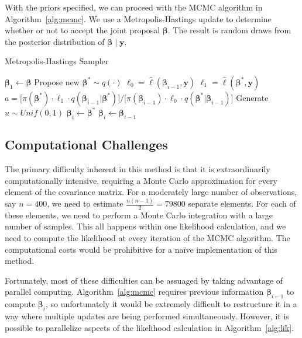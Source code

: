 \documentclass[12pt]{article}
\begin{document}
With the priors specified, we can proceed with the MCMC algorithm in Algorithm~\ref{alg:mcmc}. We use a Metropolis-Hastings update to determine whether or not to accept the joint proposal $\bm{\beta}$. The result is random draws from the posterior distribution of $\bm{\beta} \;|\; \bm{y}$.

\begin{algorithm}[!htb]
  \caption{\small Metropolis-Hastings Sampler} \label{alg:mcmc}
  \begin{algorithmic}[1]
    \State $\bm{\beta}_1 \gets \bm{\beta}$
    \State Propose new $\bm{\beta}^* \sim q(\cdot)$
    \State $\ell_0 = \hat{\ell}(\bm{\beta}_{i-1}, \bm{y})$
    \State $\ell_1 = \hat{\ell}(\bm{\beta}^*, \bm{y})$
    \State $a = \Big[\pi(\bm{\beta}^*) \cdot \ell_1 \cdot q(\bm{\beta}_{i-1}|\bm{\beta}^*)\Big]/\Big[\pi(\bm{\beta}_{i-1}) \cdot \ell_0 \cdot q(\bm{\beta}^*|\bm{\beta}_{i-1})\Big]$
    \State Generate $u \sim Unif(0, 1)$
    \State $\bm{\beta}_i \gets \bm{\beta}^*$
    \Else
    \State $\bm{\beta}_i \gets \bm{\beta}_{i-1}$
    \EndIf
    \EndFor
    \EndProcedure
  \end{algorithmic}
\end{algorithm} 




\subsection{Computational Challenges} %
\label{sec:computational_challenges}

The primary difficulty inherent in this method is that it is extraordinarily computationally intensive, requiring a Monte Carlo approximation for every element of the covariance matrix. For a moderately large number of observations, say $n = 400$, we need to estimate $\frac{n(n-1)}{2} = 79800$ separate elements. For each of these elements, we need to perform a Monte Carlo integration with a large number of samples. This all happens within one likelihood calculation, and we need to compute the likelihood at every iteration of the MCMC algorithm. The computational costs would be prohibitive for a na\"{i}ve implementation of this method.

Fortunately, most of these difficulties can be assuaged by taking advantage of parallel computing. Algorithm~\ref{alg:mcmc} requires previous information $\bm{\beta}_{i-1}$ to compute $\bm{\beta}_i$, so unfortunately it would be extremely difficult to restructure it in a way where multiple updates are being performed simultaneously. However, it is possible to parallelize aspects of the likelihood calculation in Algorithm~\ref{alg:lik}.
\end{document}
